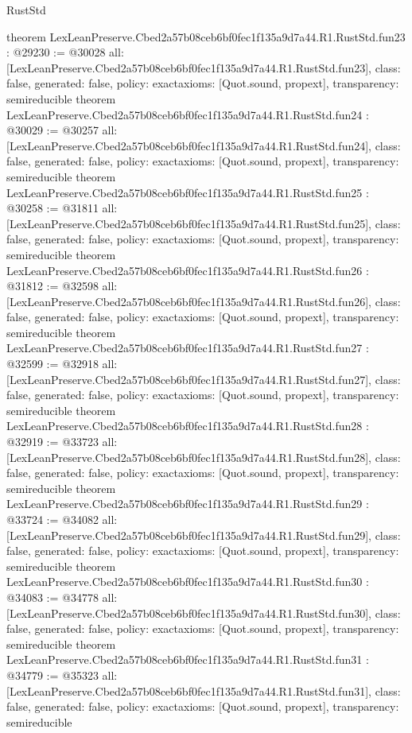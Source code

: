 \begin{lexlean}{RustStd}
\begin{coremodule}
{}
theorem LexLeanPreserve.Cbed2a57b08ceb6bf0fec1f135a9d7a44.R1.RustStd.fun23 : @29230 := @30028 {
  all: [LexLeanPreserve.Cbed2a57b08ceb6bf0fec1f135a9d7a44.R1.RustStd.fun23],
  class: false,
  generated: false,
  policy: exact{axioms: [Quot.sound, propext]},
  transparency: semireducible
}
theorem LexLeanPreserve.Cbed2a57b08ceb6bf0fec1f135a9d7a44.R1.RustStd.fun24 : @30029 := @30257 {
  all: [LexLeanPreserve.Cbed2a57b08ceb6bf0fec1f135a9d7a44.R1.RustStd.fun24],
  class: false,
  generated: false,
  policy: exact{axioms: [Quot.sound, propext]},
  transparency: semireducible
}
theorem LexLeanPreserve.Cbed2a57b08ceb6bf0fec1f135a9d7a44.R1.RustStd.fun25 : @30258 := @31811 {
  all: [LexLeanPreserve.Cbed2a57b08ceb6bf0fec1f135a9d7a44.R1.RustStd.fun25],
  class: false,
  generated: false,
  policy: exact{axioms: [Quot.sound, propext]},
  transparency: semireducible
}
theorem LexLeanPreserve.Cbed2a57b08ceb6bf0fec1f135a9d7a44.R1.RustStd.fun26 : @31812 := @32598 {
  all: [LexLeanPreserve.Cbed2a57b08ceb6bf0fec1f135a9d7a44.R1.RustStd.fun26],
  class: false,
  generated: false,
  policy: exact{axioms: [Quot.sound, propext]},
  transparency: semireducible
}
theorem LexLeanPreserve.Cbed2a57b08ceb6bf0fec1f135a9d7a44.R1.RustStd.fun27 : @32599 := @32918 {
  all: [LexLeanPreserve.Cbed2a57b08ceb6bf0fec1f135a9d7a44.R1.RustStd.fun27],
  class: false,
  generated: false,
  policy: exact{axioms: [Quot.sound, propext]},
  transparency: semireducible
}
theorem LexLeanPreserve.Cbed2a57b08ceb6bf0fec1f135a9d7a44.R1.RustStd.fun28 : @32919 := @33723 {
  all: [LexLeanPreserve.Cbed2a57b08ceb6bf0fec1f135a9d7a44.R1.RustStd.fun28],
  class: false,
  generated: false,
  policy: exact{axioms: [Quot.sound, propext]},
  transparency: semireducible
}
theorem LexLeanPreserve.Cbed2a57b08ceb6bf0fec1f135a9d7a44.R1.RustStd.fun29 : @33724 := @34082 {
  all: [LexLeanPreserve.Cbed2a57b08ceb6bf0fec1f135a9d7a44.R1.RustStd.fun29],
  class: false,
  generated: false,
  policy: exact{axioms: [Quot.sound, propext]},
  transparency: semireducible
}
theorem LexLeanPreserve.Cbed2a57b08ceb6bf0fec1f135a9d7a44.R1.RustStd.fun30 : @34083 := @34778 {
  all: [LexLeanPreserve.Cbed2a57b08ceb6bf0fec1f135a9d7a44.R1.RustStd.fun30],
  class: false,
  generated: false,
  policy: exact{axioms: [Quot.sound, propext]},
  transparency: semireducible
}
theorem LexLeanPreserve.Cbed2a57b08ceb6bf0fec1f135a9d7a44.R1.RustStd.fun31 : @34779 := @35323 {
  all: [LexLeanPreserve.Cbed2a57b08ceb6bf0fec1f135a9d7a44.R1.RustStd.fun31],
  class: false,
  generated: false,
  policy: exact{axioms: [Quot.sound, propext]},
  transparency: semireducible
}
\end{coremodule}
\end{lexlean}
